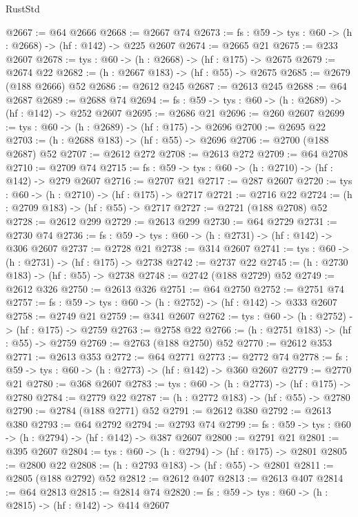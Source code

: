 \begin{lexlean}{RustStd}
\begin{coremodule}
@2667 := @64 @2666
@2668 := @2667 @74
@2673 := {fs : @59} -> {tys : @60} -> (h : @2668) -> (hf : @142) -> @225 @2607
@2674 := @2665 @21
@2675 := @233 @2607
@2678 := {tys : @60} -> (h : @2668) -> (hf : @175) -> @2675
@2679 := @2674 @22
@2682 := (h : @2667 @183) -> (hf : @55) -> @2675
@2685 := @2679 (@188 @2666) @52
@2686 := @2612 @245
@2687 := @2613 @245
@2688 := @64 @2687
@2689 := @2688 @74
@2694 := {fs : @59} -> {tys : @60} -> (h : @2689) -> (hf : @142) -> @252 @2607
@2695 := @2686 @21
@2696 := @260 @2607
@2699 := {tys : @60} -> (h : @2689) -> (hf : @175) -> @2696
@2700 := @2695 @22
@2703 := (h : @2688 @183) -> (hf : @55) -> @2696
@2706 := @2700 (@188 @2687) @52
@2707 := @2612 @272
@2708 := @2613 @272
@2709 := @64 @2708
@2710 := @2709 @74
@2715 := {fs : @59} -> {tys : @60} -> (h : @2710) -> (hf : @142) -> @279 @2607
@2716 := @2707 @21
@2717 := @287 @2607
@2720 := {tys : @60} -> (h : @2710) -> (hf : @175) -> @2717
@2721 := @2716 @22
@2724 := (h : @2709 @183) -> (hf : @55) -> @2717
@2727 := @2721 (@188 @2708) @52
@2728 := @2612 @299
@2729 := @2613 @299
@2730 := @64 @2729
@2731 := @2730 @74
@2736 := {fs : @59} -> {tys : @60} -> (h : @2731) -> (hf : @142) -> @306 @2607
@2737 := @2728 @21
@2738 := @314 @2607
@2741 := {tys : @60} -> (h : @2731) -> (hf : @175) -> @2738
@2742 := @2737 @22
@2745 := (h : @2730 @183) -> (hf : @55) -> @2738
@2748 := @2742 (@188 @2729) @52
@2749 := @2612 @326
@2750 := @2613 @326
@2751 := @64 @2750
@2752 := @2751 @74
@2757 := {fs : @59} -> {tys : @60} -> (h : @2752) -> (hf : @142) -> @333 @2607
@2758 := @2749 @21
@2759 := @341 @2607
@2762 := {tys : @60} -> (h : @2752) -> (hf : @175) -> @2759
@2763 := @2758 @22
@2766 := (h : @2751 @183) -> (hf : @55) -> @2759
@2769 := @2763 (@188 @2750) @52
@2770 := @2612 @353
@2771 := @2613 @353
@2772 := @64 @2771
@2773 := @2772 @74
@2778 := {fs : @59} -> {tys : @60} -> (h : @2773) -> (hf : @142) -> @360 @2607
@2779 := @2770 @21
@2780 := @368 @2607
@2783 := {tys : @60} -> (h : @2773) -> (hf : @175) -> @2780
@2784 := @2779 @22
@2787 := (h : @2772 @183) -> (hf : @55) -> @2780
@2790 := @2784 (@188 @2771) @52
@2791 := @2612 @380
@2792 := @2613 @380
@2793 := @64 @2792
@2794 := @2793 @74
@2799 := {fs : @59} -> {tys : @60} -> (h : @2794) -> (hf : @142) -> @387 @2607
@2800 := @2791 @21
@2801 := @395 @2607
@2804 := {tys : @60} -> (h : @2794) -> (hf : @175) -> @2801
@2805 := @2800 @22
@2808 := (h : @2793 @183) -> (hf : @55) -> @2801
@2811 := @2805 (@188 @2792) @52
@2812 := @2612 @407
@2813 := @2613 @407
@2814 := @64 @2813
@2815 := @2814 @74
@2820 := {fs : @59} -> {tys : @60} -> (h : @2815) -> (hf : @142) -> @414 @2607

\end{coremodule}
\end{lexlean}
